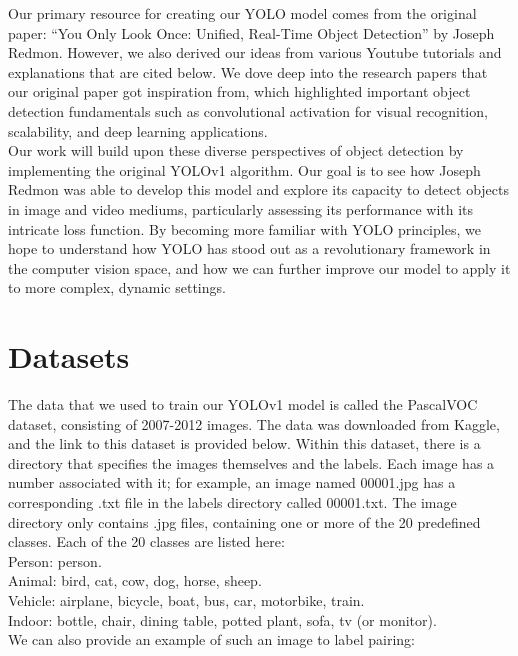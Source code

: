 \documentclass{article}
\begin{document}
Our primary resource for creating our YOLO model comes from the original paper: ``You Only Look Once: Unified, Real-Time Object Detection'' by Joseph Redmon. However, we also derived our ideas from various Youtube tutorials and explanations that are cited below. We dove deep into the research papers that our original paper got inspiration from, which highlighted important object detection fundamentals such as convolutional activation for visual recognition, scalability, and deep learning applications. \\

Our work will build upon these diverse perspectives of object detection by implementing the original YOLOv1 algorithm. Our goal is to see how Joseph Redmon was able to develop this model and explore its capacity to detect objects in image and video mediums, particularly assessing its performance with its intricate loss function. By becoming more familiar with YOLO principles, we hope to understand how YOLO has stood out as a revolutionary framework in the computer vision space, and how we can further improve our model to apply it to more complex, dynamic settings.

\section{Datasets}
The data that we used to train our YOLOv1 model is called the PascalVOC dataset, consisting of 2007-2012 images. The data was downloaded from Kaggle, and the link to this dataset is provided below. Within this dataset, there is a directory that specifies the images themselves and the labels. Each image has a number associated with it; for example, an image named 00001.jpg has a corresponding .txt file in the labels directory called 00001.txt. The image directory only contains .jpg files, containing one or more of the 20 predefined classes. Each of the 20 classes are listed here: \\

Person: person. \\
Animal: bird, cat, cow, dog, horse, sheep. \\
Vehicle: airplane, bicycle, boat, bus, car, motorbike, train. \\
Indoor: bottle, chair, dining table, potted plant, sofa, tv (or monitor). \\

We can also provide an example of such an image to label pairing: \\
\end{document}
